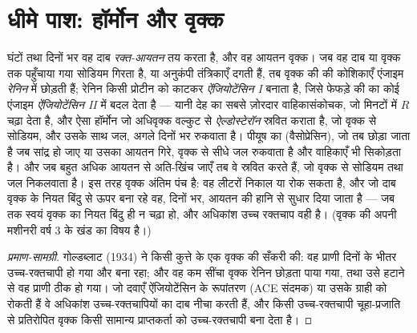 \section{धीमे पाश: हॉर्मोन और वृक्क}

\begin{proposition}[रेनिन, ऐंजियोटेंसिन, ऐल्डोस्टेरॉन, और वह आयतन]\label{prop:b2:blood-pressure:raas}
घंटों तथा दिनों भर वह दाब \emph{रक्त-आयतन} तय करता है,
और वह आयतन वृक्क। जब वह दाब या वृक्क तक पहुँचाया गया सोडियम
गिरता है, या अनुकंपी तंत्रिकाएँ दगती हैं, तब वृक्क की
 की कोशिकाएँ एंजाइम \emph{रेनिन}  में छोड़ती
हैं; रेनिन किसी  प्रोटीन को काटकर \emph{ऐंजियोटेंसिन I} बनाता है, जिसे
फेफड़े की  का कोई एंजाइम \emph{ऐंजियोटेंसिन II} में बदल देता है
--- यानी देह का सबसे ज़ोरदार वाहिकासंकोचक, जो मिनटों में $R$ चढ़ा
देता है, और ऐसा हॉर्मोन जो अधिवृक्क वल्कुट से
\emph{ऐल्डोस्टेरॉन} स्रवित कराता है, जो वृक्क से सोडियम, और उसके साथ
जल, अगले दिनों भर रुकवाता है। पीयूष का
\emph{} (वैसोप्रेसिन), जो तब छोड़ा जाता है जब 
सांद्र हो जाए या उसका आयतन गिरे, वृक्क से सीधे जल
रुकवाता है और वाहिकाएँ भी सिकोड़ता है। और जब 
बहुत अधिक आयतन से अति-खिंच जाएँ तब वे \emph{} स्रवित करते हैं, जो वृक्क से सोडियम तथा जल निकलवाता है। इस तरह
वृक्क अंतिम पंच है: वह लीटरों निकाल या रोक सकता है,
और जो दाब वृक्क के नियत बिंदु से ऊपर बना रहे वह, दिनों भर,
आयतन की हानि से सुधार दिया जाता है --- जब तक स्वयं वृक्क का
नियत बिंदु ही न चढ़ा हो, और अधिकांश उच्च रक्तचाप वही है।
(वृक्क की अपनी मशीनरी वर्ष 3 के खंड का विषय है।)
\end{proposition}
\begin{proof}[प्रमाण-सामग्री]
गोल्डब्लाट (1934) ने किसी कुत्ते के एक वृक्क की  सँकरी की: वह
प्राणी दिनों के भीतर उच्च-रक्तचापी हो गया और बना रहा; और वह
कम सींचा वृक्क रेनिन छोड़ता पाया गया, तथा उसे हटाने से
वह प्राणी ठीक हो गया। जो दवाएँ ऐंजियोटेंसिन के रूपांतरण
(ACE संदमक) या उसके ग्राही को रोकती हैं वे अधिकांश
उच्च-रक्तचापियों का दाब नीचा करती हैं, और किसी उच्च-रक्तचापी
चूहा-प्रजाति से प्रतिरोपित वृक्क किसी सामान्य प्राप्तकर्ता को उच्च-रक्तचापी बना देता है।
\end{proof}

